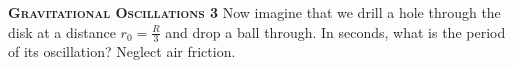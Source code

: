 \begin{problem}
\textbf{\textsc{Gravitational Oscillations 3}} Now imagine that we drill a hole through the disk at a distance \(r_0= \frac{R}{3}\) and drop a ball through. In seconds, what is the period of its oscillation? Neglect air friction.

\end{problem}
